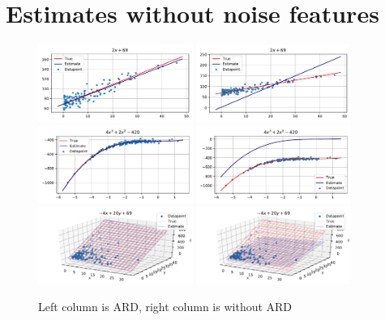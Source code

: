 \documentclass[12pt]{article}
\begin{document}
    \appendix
    \section{Estimates without noise features}
        \begin{figure}[H]
            \centering
            \caption{Left column is ARD, right column is without ARD} \label{fig:appendixestimates}
            \includegraphics[width=0.45\textwidth]{f_1_noise0_estplot_ard}
            \includegraphics[width=0.45\textwidth]{f_1_noise0_estplot_regular}
            \includegraphics[width=0.45\textwidth]{f_2_noise0_estplot_ard}
            \includegraphics[width=0.45\textwidth]{f_2_noise0_estplot_regular}
            \includegraphics[width=0.45\textwidth]{f_3_noise0_estplot_ard}
            \includegraphics[width=0.45\textwidth]{f_3_noise0_estplot_regular}

\end{figure}
\end{document}

